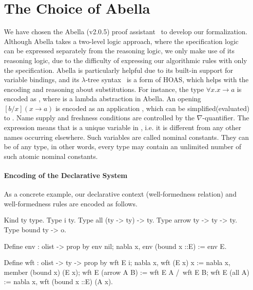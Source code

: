 \section{The Choice of Abella}

We have chosen the Abella (v2.0.5) proof assistant~\citep{AbellaDesc} to
develop our formalization.
Although Abella takes a two-level logic approach,
where the specification logic can be expressed separately from the
reasoning logic, we only make use of its reasoning logic, due to the
difficulty of expressing our algorithmic rules with only the specification.
Abella is particularly helpful due to its built-in support for variable bindings, and
its $\lambda$-tree syntax~\citep{miller2000abstract} is a form of HOAS,
which helps with the encoding and reasoning about substitutions.  For
instance, the type $\forall x. x \to a$ is encoded as , where  is a lambda abstraction in
Abella. An opening $[b/x](x\to a)$ is encoded as an application
, which can be simplified(evaluated) to
.
Name supply and freshness conditions are controlled by the
$\nabla$-quantifier.  The expression  means that
 is a unique variable in , i.e. it is different
from any other names occurring elsewhere.  Such variables are called
nominal constants.  They can be of any type, in other words, every
type may contain an unlimited number of such atomic nominal constants.


\paragraph{Encoding of the Declarative System}
As a concrete example, our declarative context (well-formedness relation)
and well-formedness rules are encoded as follows.
\begin{abella}
	Kind ty     type.
	Type i      ty.                %
	Type all    (ty -> ty) -> ty.    %
	Type arrow  ty -> ty -> ty.      %
	Type bound  ty -> o.            %
	
	Define env : olist -> prop by
		env nil;
		nabla x, env (bound x ::E) := env E.
	
	Define wft : olist -> ty -> prop by
		wft E i;
		nabla x, wft (E x) x := nabla x, member (bound x) (E x);
		wft E (arrow A B) := wft E A /\ wft E B;
		wft E (all A) := nabla x, wft (bound x ::E) (A x).
\end{abella}

